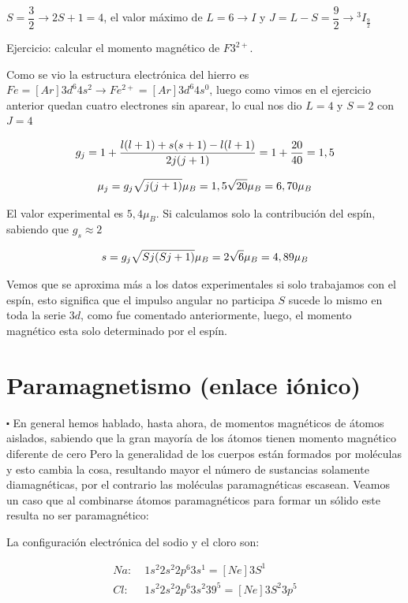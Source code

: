$S=\dfrac{3}{2}\rightarrow 2S+1=4$, el valor máximo de $L=6 \rightarrow I$ y $J=L-S=\dfrac{9}{2}\rightarrow {^{3}}I_{\frac{9}{2}}$

Ejercicio: calcular el momento magnético de $F3^{2+}$.

Como se vio la estructura electrónica del hierro es $Fe = [Ar]3d^{6}4s^{2} \rightarrow Fe^{2+}=[Ar]3d^{6}4s^{0}$, luego como vimos en el ejercicio anterior quedan cuatro electrones sin aparear, lo cual nos dio $L=4$ y $S=2$ con $J=4$

\begin{equation*}
	g_{j}= 1 +\dfrac{l(l + 1)+s(s + 1)-l(l + 1)}{2j(j + 1)}=1+\dfrac{20}{40}=1,5
\end{equation*}

\begin{equation*}
	\mu_{j}= g_{j}\sqrt{j(j + 1)}\mu_{B}=1,5\sqrt{20}\mu_{B}=6,70\mu_{B}
\end{equation*}


El valor experimental es $5,4 \mu_{B}$. Si calculamos solo la contribución del espín, sabiendo que $g_{s}\approx 2$

\begin{equation*}
	s= g_{j}\sqrt{Sj(Sj + 1)}\mu_{B}=2\sqrt{6}\mu_{B}=4,89\mu_{B}
\end{equation*}


Vemos que se aproxima más a los datos experimentales si solo trabajamos con el espín, esto significa que el impulso angular no participa $S$ sucede lo mismo en toda la serie $3d$, como fue comentado anteriormente, luego, el momento magnético esta solo determinado por el espín.


\section{Paramagnetismo (enlace iónico)}

$\centerdot$ En general hemos hablado, hasta ahora, de momentos magnéticos de átomos aislados, sabiendo que la gran mayoría de los átomos tienen momento magnético diferente de cero Pero la generalidad de los cuerpos están formados por moléculas y esto cambia la cosa, resultando mayor el número de sustancias solamente diamagnéticas, por el contrario las moléculas paramagnéticas escasean. Veamos un caso que al combinarse átomos paramagnéticos para formar un sólido este resulta no ser paramagnético:

La configuración electrónica del sodio y el cloro son:

\begin{equation*}
\begin{aligned}
	Na:\; &1s^{2}2s^{2}2p^{6}3s^{1}=[Ne]3S^{1}\\
	Cl:\; &1s^{2}2s^{2}2p^{6}3s^{2}39^{5}=[Ne]3S^{2}3p^{5} 
\end{aligned}
\end{equation*}

